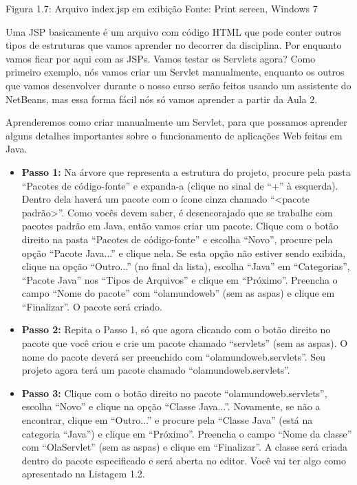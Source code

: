 Figura 1.7: Arquivo index.jsp em exibição
Fonte: Print screen, Windows 7

Uma JSP basicamente é um arquivo com código HTML que pode conter outros tipos de estruturas que vamos aprender no decorrer da disciplina. Por enquanto vamos ficar por aqui com as JSPs. Vamos testar os Servlets agora? Como primeiro exemplo, nós vamos criar um Servlet manualmente, enquanto os outros que vamos desenvolver durante o nosso curso serão feitos usando um assistente do NetBeans, mas essa forma fácil nós só vamos aprender a partir da Aula 2.

Aprenderemos como criar manualmente um Servlet, para que possamos aprender alguns detalhes importantes sobre o funcionamento de aplicações Web feitas em Java.

\begin{itemize}
    \item \textbf{Passo 1:} Na árvore que representa a estrutura do projeto, procure pela pasta ``Pacotes de código-fonte'' e expanda-a (clique no sinal de ``+'' à esquerda). Dentro dela haverá um pacote com o ícone cinza chamado ``<pacote padrão>''. Como vocês devem saber, é desencorajado que se trabalhe com pacotes padrão em Java, então vamos criar um pacote. Clique com o botão direito na pasta ``Pacotes de código-fonte'' e escolha ``Novo'', procure pela opção ``Pacote Java...'' e clique nela. Se esta opção não estiver sendo exibida, clique na opção ``Outro...'' (no final da lista), escolha ``Java'' em ``Categorias'', ``Pacote Java'' nos ``Tipos de Arquivos'' e clique em ``Próximo''. Preencha o campo ``Nome do pacote'' com ``olamundoweb'' (sem as aspas) e clique em ``Finalizar''. O pacote será criado.
    
    \item \textbf{Passo 2:} Repita o Passo 1, só que agora clicando com o botão direito no pacote que você criou e crie um pacote chamado ``servlets'' (sem as aspas). O nome do pacote deverá ser preenchido com ``olamundoweb.servlets''. Seu projeto agora terá um pacote chamado ``olamundoweb.servlets''.
    
    \item \textbf{Passo 3:} Clique com o botão direito no pacote ``olamundoweb.servlets'', escolha ``Novo'' e clique na opção ``Classe Java...''. Novamente, se não a encontrar, clique em ``Outro...'' e procure pela ``Classe Java'' (está na categoria ``Java'') e clique em ``Próximo''. Preencha o campo ``Nome da classe'' com ``OlaServlet'' (sem as aspas) e clique em ``Finalizar''. A classe será criada dentro do pacote especificado e será aberta no editor. Você vai ter algo como apresentado na Listagem 1.2.
    

\end{itemize}
